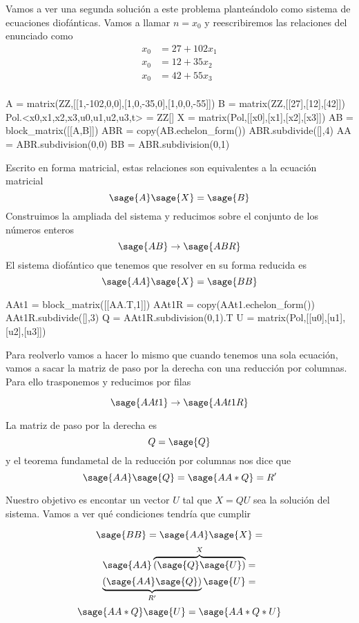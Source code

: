 \documentclass{amsart}
\begin{document}
Vamos a ver una segunda solución a este problema planteándolo como sistema de 
ecuaciones diofánticas. Vamos a llamar $n = x_0$ y reescribiremos las relaciones
del enunciado como 
\begin{align*}
x_0 &= 27 + 102 x_1 \\
x_0 &= 12 + 35 x_2 \\
x_0 &= 42 + 55 x_3 \\ 
\end{align*}

\begin{sageblock}
A = matrix(ZZ,[[1,-102,0,0],[1,0,-35,0],[1,0,0,-55]])
B = matrix(ZZ,[[27],[12],[42]])
Pol.<x0,x1,x2,x3,u0,u1,u2,u3,t> = ZZ[]
X = matrix(Pol,[[x0],[x1],[x2],[x3]])
AB = block_matrix([[A,B]])
ABR = copy(AB.echelon_form())
ABR.subdivide([],4)
AA = ABR.subdivision(0,0)
BB = ABR.subdivision(0,1)
\end{sageblock}

Escrito en forma matricial, estas relaciones son equivalentes a la ecuación
matricial
$$ \sage{A} \sage{X} = \sage{B}$$
Construimos la ampliada del sistema y reducimos sobre el conjunto de los números
enteros
$$ \sage{AB} \to \sage{ABR}$$
El sistema diofántico que tenemos que resolver en su forma reducida es 
$$ \sage{AA} \sage{X} = \sage{BB}$$

\begin{sageblock}
AAt1 = block_matrix([[AA.T,1]])
AAt1R = copy(AAt1.echelon_form())
AAt1R.subdivide([],3)
Q = AAt1R.subdivision(0,1).T
U = matrix(Pol,[[u0],[u1],[u2],[u3]])
\end{sageblock}

Para reolverlo vamos a hacer lo mismo que cuando tenemos una sola ecuación, vamos
a sacar la matriz de paso por la derecha con una reducción por columnas. Para ello
trasponemos y reducimos por filas

$$ \sage{AAt1} \to \sage{AAt1R} $$

La matriz de paso por la derecha es 
$$ Q = \sage{Q}$$
y el teorema fundametal de la reducción por columnas
nos dice que 
$$\sage{AA} \sage{Q} = \sage{AA*Q} = R'$$

Nuestro objetivo es encontar un vector $U$ tal que $X = QU$ sea la solución del 
sistema. Vamos a ver qué condiciones tendría que cumplir

$$ \sage{BB} = \sage{AA} \sage{X} = $$
$$ \sage{AA} \overbrace{\left(\sage{Q} \sage{U}\right)}^X = $$
$$ \underbrace{\left(\sage{AA} \sage{Q} \right)}_{R'} \sage{U} = $$
$$ \sage{AA*Q} \sage{U} = \sage{AA*Q*U}$$
\end{document}
